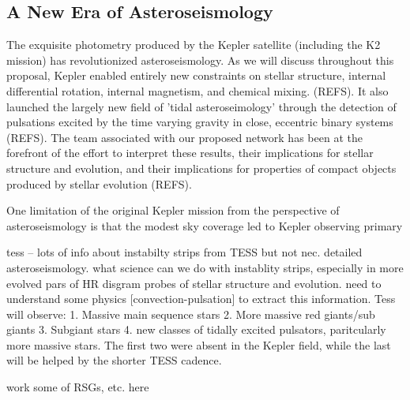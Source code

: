 {\color{blue}
\subsection{A New Era of Asteroseismology}

The exquisite photometry produced by the Kepler satellite (including the K2 mission) has revolutionized asteroseismology.   As we will discuss throughout this proposal, Kepler enabled entirely new constraints on stellar structure, internal differential rotation, internal magnetism, and chemical mixing. (REFS).  It also launched the largely new field of 'tidal asteroseimology' through the detection of pulsations  excited by the time varying gravity in close, eccentric binary systems (REFS). The team associated with our proposed network has been at the forefront of the effort to interpret these results, their implications for stellar structure and evolution, and their implications for properties of compact objects produced by stellar evolution (REFS).   

One limitation of the original Kepler mission from the perspective of asteroseismology is that the modest sky coverage led to Kepler observing primary

tess -- lots of info about instabilty strips from TESS but not nec. detailed asteroseismology.  what science can we do with instablity strips, especially in more evolved pars of HR disgram  probes of stellar structure and evolution.   need to understand some physics [convection-pulsation] to extract this information.   Tess will observe: 1. Massive main sequence stars 2. More massive red giants/sub giants 3. Subgiant stars 4.  new classes of tidally excited pulsators, paritcularly more massive stars.   The first two were absent in the Kepler field, while the last will be helped by the shorter TESS cadence.

work some of RSGs, etc. here




}